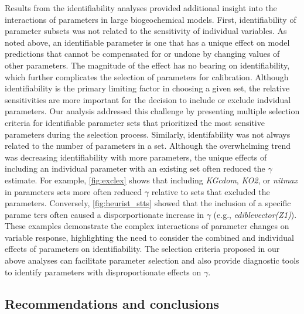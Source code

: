 \documentclass[letterpaper,12pt,oneside]{article}\usepackage[]{graphicx}\usepackage[]{color}
\begin{document}
Results from the identifiability analyses provided additional insight into the interactions of parameters in large biogeochemical models.  First, identifiability of parameter subsets was not related to the sensitivity of individual variables. As noted above, an identifiable parameter is one that has a unique effect on model predictions that cannot be compensated for or undone by changing values of other parameters. The magnitude of the effect has no bearing on identifiability, which further complicates the selection of parameters for calibration.  Although identifiability is the primary limiting factor in choosing a given set, the relative sensitivities are more important for the decision to include or exclude indvidual parameters.  Our analysis addressed this challenge by presenting multiple selection criteria for identifiable parameter sets that prioritized the most sensitive parameters during the selection process.  Similarly, identifability was not always related to the number of parameters in a set. Although the overwhelming trend was decreasing identifiability with more parameters, the unique effects of including an individual parameter with an existing set often reduced the $\gamma$ estimate. For example, \cref{fig:exclex} shows that including \textit{KGcdom}, \textit{KO2}, or \textit{nitmax} in parameters sets more often reduced $\gamma$ relative to sets that excluded the parameters.  Conversely, \cref{fig:heurist_stts} showed that the inclusion of a specific parame ters often caused a disporportionate increase in $\gamma$ (e.g., \textit{ediblevector(Z1)}). These examples demonstrate the complex interactions of parameter changes on variable response, highlighting the need to consider the combined and individual effects of parameters on identifiability. The selection criteria proposed in our above analyses can facilitate parameter selection and also provide diagnostic tools to identify parameters with disproportionate effects on $\gamma$.

\subsection{Recommendations and conclusions}
\end{document}
